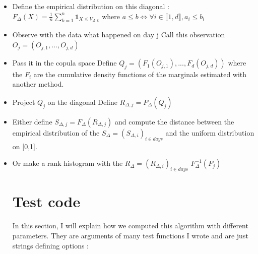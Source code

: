 \documentclass{article}
\begin{document}
\begin{itemize}
\item Define the empirical distribution on this diagonal : \newline
\newline
	\begin{math} F_\Delta (X) = \frac{1}{n} \sum_{k=1}^n \mathds{1}_{X \leq V_{\Delta ,k}} \end{math}
	\newline
	\newline
	where \begin{math} a \leq b \iff \forall i \in \llbracket 1,d \rrbracket,  a_i \leq b_i  \end{math}
	
\item Observe with the data what happened on day j \newline
		Call this observation $O_j = (O_{j,1},...,O_{j,d})$

\item Pass it in the copula space \newline
		Define \begin{math} Q_j = (F_1 (O_{j,1}),...,F_d (O_{j,d})) \end{math} \newline
		where the $F_i$ are the cumulative density functions of the marginals estimated with another method.
		
\item Project $Q_j$ on the diagonal \newline
		Define $R_{\Delta ,j} = P_\Delta (Q_j)$

\item Either define $S_{\Delta,j} = F_\Delta (R_{\Delta,j})  $ \newline
	and compute the distance between the empirical distribution of the $S_{\Delta}=(S_{\Delta,i})_{i \in days}$  and the uniform distribution on [0,1].

\item Or make a rank histogram with the $R_{\Delta}=(R_{\Delta,i})_{i \in days}$
	\begin{math} F_\Delta^{-1} (P_j) \end{math}
	
	\section{Test code}
	
	In this section, I will explain how we computed this algorithm with different parameters. They are arguments of many test functions I wrote and are just strings defining options :\newline
	

\end{itemize}
\end{document}

